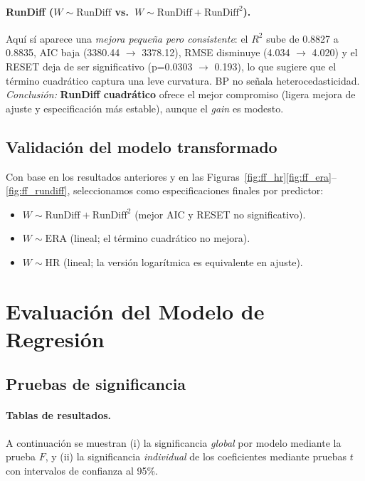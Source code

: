 \documentclass[man,floatsintext]{apa7}
\begin{document}
    \paragraph{RunDiff (\(W \sim \text{RunDiff}\) vs.\ \(W \sim \text{RunDiff}+\text{RunDiff}^2\)).}
    Aquí sí aparece una \textit{mejora pequeña pero consistente}: el \(R^2\) sube de 0.8827 a 0.8835, AIC baja (3380.44 \(\rightarrow\) 3378.12), RMSE disminuye (4.034 \(\rightarrow\) 4.020) y el RESET deja de ser significativo (p=0.0303 \(\rightarrow\) 0.193), lo que sugiere que el término cuadrático captura una leve curvatura. BP no señala heterocedasticidad. 
    \textit{Conclusión:} \textbf{RunDiff cuadrático} ofrece el mejor compromiso (ligera mejora de ajuste y especificación más estable), aunque el \textit{gain} es modesto.

\subsection{Validación del modelo transformado}

    Con base en los resultados anteriores y en las Figuras~\ref{fig:ff_hr}\ref{fig:ff_era}--\ref{fig:ff_rundiff}, seleccionamos como especificaciones finales por predictor:
    \begin{itemize}
        \item \(W \sim \text{RunDiff} + \text{RunDiff}^2\) (mejor AIC y RESET no significativo).
        \item \(W \sim \text{ERA}\) (lineal; el término cuadrático no mejora).
        \item \(W \sim \text{HR}\) (lineal; la versión logarítmica es equivalente en ajuste).
    \end{itemize}
\section{Evaluación del Modelo de Regresión}
\subsection{Pruebas de significancia}
\paragraph{Tablas de resultados.}
A continuación se muestran (i) la significancia \emph{global} por modelo mediante la prueba \(F\), y (ii) la significancia 
\emph{individual} de los coeficientes mediante pruebas \(t\) con intervalos de confianza al 95\%.
\end{document}
